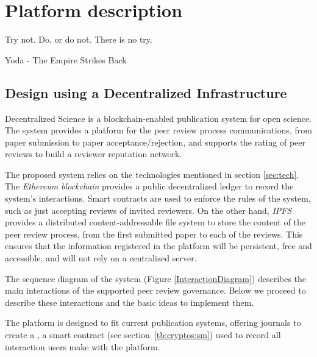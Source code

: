 \chapter{Platform description}
\label{cha:platform-description}

\begin{FraseCelebre}
  \begin{Frase}
    Try not. Do, or do not. There is no try.
  \end{Frase}
  \begin{Fuente}
    Yoda - The Empire Strikes Back
  \end{Fuente}
\end{FraseCelebre}

\section{Design using a Decentralized Infrastructure}
\label{archAndDes}
Decentralized Science is a blockchain-enabled publication system for open
science. The system provides a platform for the peer review process
communications, from paper submission to paper acceptance/rejection, and
supports the rating of peer reviews to build a reviewer reputation network.

The proposed system relies on the technologies mentioned in section
\ref{sec:tech}. The \emph{Ethereum blockchain} provides a public decentralized
ledger to record the system's interactions. Smart contracts are used to enforce
the rules of the system, such as just accepting reviews of invited reviewers. On
the other hand, \emph{IPFS} provides a distributed content-addressable file
system to store the content of the peer review process, from the first submitted
paper to each of the reviews. This ensures that the information registered in
the platform will be persistent, free and accessible, and will not rely on a
centralized server.


The sequence diagram of the system (Figure \ref{InteractionDiagram}) describes
the main interactions of the supported peer review governance. Below we proceed
to describe these interactions and the basic ideas to implement them.


\label{cha:platform-description-6}

The platform is designed to fit current publication systems, offering journals
to create a , a smart contract (see
section~\ref{tb:cryptos:sm}) used to record all interaction users make with the
platform.

